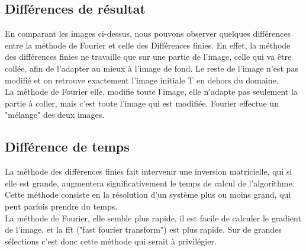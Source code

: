 \newpage
\subsection{Différences de résultat}
En comparant les images ci-dessus, nous pouvons observer quelques différences entre la méthode de Fourier et celle des Différences finies. En effet, la méthode des différences finies ne travaille que sur une partie de l'image, celle qui va être collée, afin de l'adapter au mieux à l'image de fond. Le reste de l'image n'est pas modifié et on retrouve exactement l'image initiale T en dehors du domaine. \\
La méthode de Fourier elle, modifie toute l'image, elle n'adapte pas seulement la partie à coller, mais c'est toute l'image qui est modifiée. Fourier effectue un "mélange" des deux images. \\
\subsection{Différence de temps}
La méthode des différences finies fait intervenir une inversion matricielle, qui si elle est grande, augmentera significativement le temps de calcul de l'algorithme. Cette méthode consiste en la résolution d'un système plus ou moins grand, qui peut parfois prendre du temps. \\
La méthode de Fourier, elle semble plus rapide, il est facile de calculer le gradient de l'image, et la fft ("fast fourier transform") est plus rapide. Sur de grandes sélections c'est donc cette méthode qui serait à privilégier. 